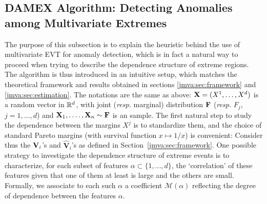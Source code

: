 \subsection{DAMEX Algorithm:  Detecting Anomalies among Multivariate  Extremes}\label{jmva:sec:algo}
The purpose of this subsection is to explain the heuristic behind the
use of multivariate EVT for anomaly detection, which is in fact a
natural way to proceed when trying to describe the dependence
structure of extreme regions. The algorithm is thus introduced in an
intuitive setup,  which matches the theoretical framework and results obtained in sections \ref{jmva:sec:framework} and \ref{jmva:sec:estimation}.
The notations are the same as above:  $\mathbf X = (X^1,\ldots,X^d)$ is a
random vector in $\mathbb{R}^d$, with joint (\emph{resp.} marginal)
distribution $\mathbf F$ (\emph{resp.} $F_j$, $j =1,\ldots,d$)  and $\mathbf
X_1,.\ldots, \mathbf X_n \sim \mathbf F$ is an \iid  sample.
The first natural step to study the dependence between the margins $X^j$ is to
standardize them, and the choice of standard Pareto margins (with
survival function $x \mapsto 1/x$) is convenient: Consider thus the $\mathbf V_i$'s and $\mathbf{\widehat V}_i$'s as defined in Section~\ref{jmva:sec:framework}.
%
One possible strategy  to investigate the dependence structure of
extreme events is to characterize, for each subset of features $\alpha
\subset \{1,...,d\}$, the `correlation' of these features given that
one of them at least  is large and the others are small. Formally, we
associate to each such $\alpha$ a coefficient $\mathcal{M}(\alpha)$ %
reflecting the degree of dependence between the features $\alpha$.
%
